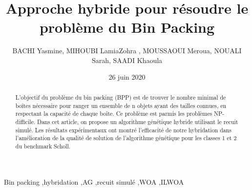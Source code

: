 \documentclass[preprint]{elsarticle}
\begin{document}
\begin{frontmatter}



\title{Approche hybride pour résoudre le problème du Bin Packing}


\author{BACHI Yasmine, MIHOUBI LamiaZohra , MOUSSAOUI Meroua, NOUALI Sarah, SAADI Khaoula}

\address{Ecole nationale Supérieure d'Informatique -ESI-Alger}
\date{26 juin 2020}
\begin{abstract}
L’objectif du problème du bin packing (BPP) est de trouver le nombre minimal de boîtes nécessaire pour ranger un ensemble de n objets ayant des tailles connues, en respectant la capacité de chaque boîte. Ce problème est parmis les problèmes NP-difficile. Dans cet article, on propose un algorithme génétique  hybride utilisant le recuit simulé. Les résultats expérimentaux   ont montré l’efficacité de notre hybridation dans l’amélioration de la qualité de solution de l’algorithme génétique pour les classes 1 et 2 du benchmark Scholl. \end{abstract}

\begin{keyword}
Bin packing \sep hybridation \sep AG \sep recuit simulé \sep WOA \sep ILWOA 

\end{keyword}

\end{frontmatter}
\end{document}
